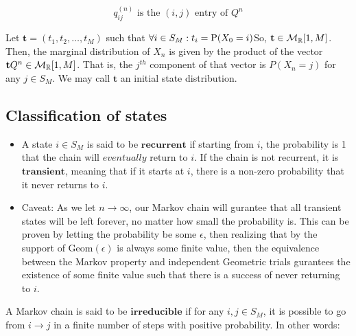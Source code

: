 $$q_{ij}^{(n)} \text{ is the } (i,j) \text{ entry of } Q^n$$

\begin{definition} Let $\textbf{t} = (t_1,t_2,\dots,t_M)$ such that $\forall i \in S_M : t_i = \text{P}(X_0 = i)$So, $\textbf{t} \in \mathcal{M}_{\mathbb{R}}[1,M]$. Then, the marginal distribution of $X_n$ is given by the product of the vector $\textbf{t} Q^n \in \mathcal{M}_{\mathbb{R}}[1,M]$. That is, the $j^{th}$ component of that vector is $P(X_n = j)$ for any $j \in S_M$. We may call $\textbf{t}$ an initial state distribution.
\end{definition}

\subsection{Classification of states}

\begin{itemize}
\item A state $i \in S_M$ is said to be $\textbf{recurrent}$ if starting from $i$, the probability is 1 that the chain will $\textit{eventually}$ return to $i$. If the chain is not recurrent, it is $\textbf{transient}$, meaning that if it starts at $i$, there is a non-zero probability that it never returns to $i$.

\item Caveat: As we let $n \to \infty$, our Markov chain will gurantee that all transient states will be left forever, no matter how small the probability is. This can be proven by letting the probability be some $\epsilon$, then realizing that by the support of $\text{Geom}(\epsilon)$ is always some finite value, then the equivalence between the Markov property and independent Geometric trials gurantees the existence of some finite value such that there is a success of never returning to $i$.
\end{itemize}

\begin{definition}[Reducibility] A Markov chain is said to be $\textbf{irreducible}$ if for any $i,j \in S_M$, it is possible to go from $i \to j$ in a finite number of steps with positive probability. In other words:
\end{definition}

